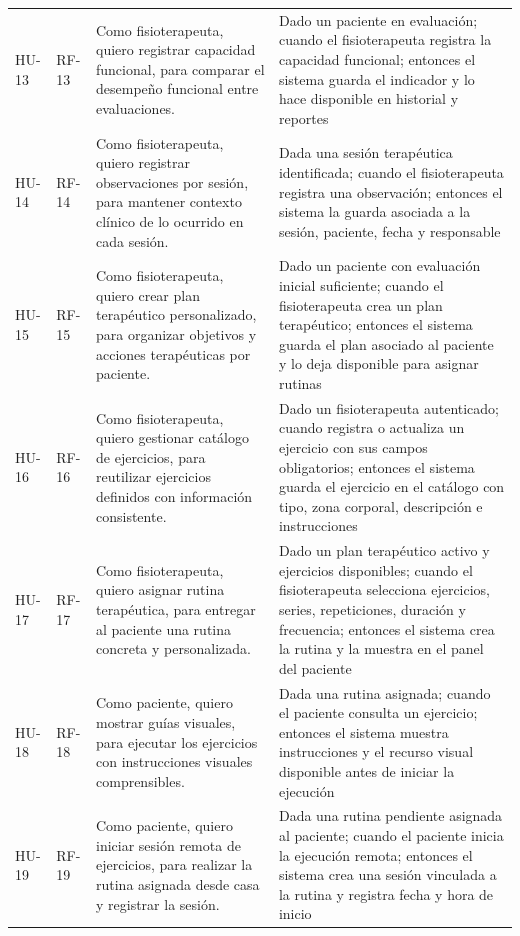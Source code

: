 \documentclass[12pt,a4paper]{article}
\begin{document}
\begin{longtable}{p{}p{}p{}p{}}
HU-13 & RF-13 & Como fisioterapeuta, quiero registrar capacidad funcional, para comparar el desempeño funcional entre evaluaciones. & Dado un paciente en evaluación; cuando el fisioterapeuta registra la capacidad funcional; entonces el sistema guarda el indicador y lo hace disponible en historial y reportes \\
HU-14 & RF-14 & Como fisioterapeuta, quiero registrar observaciones por sesión, para mantener contexto clínico de lo ocurrido en cada sesión. & Dada una sesión terapéutica identificada; cuando el fisioterapeuta registra una observación; entonces el sistema la guarda asociada a la sesión, paciente, fecha y responsable \\
HU-15 & RF-15 & Como fisioterapeuta, quiero crear plan terapéutico personalizado, para organizar objetivos y acciones terapéuticas por paciente. & Dado un paciente con evaluación inicial suficiente; cuando el fisioterapeuta crea un plan terapéutico; entonces el sistema guarda el plan asociado al paciente y lo deja disponible para asignar rutinas \\
HU-16 & RF-16 & Como fisioterapeuta, quiero gestionar catálogo de ejercicios, para reutilizar ejercicios definidos con información consistente. & Dado un fisioterapeuta autenticado; cuando registra o actualiza un ejercicio con sus campos obligatorios; entonces el sistema guarda el ejercicio en el catálogo con tipo, zona corporal, descripción e instrucciones \\
HU-17 & RF-17 & Como fisioterapeuta, quiero asignar rutina terapéutica, para entregar al paciente una rutina concreta y personalizada. & Dado un plan terapéutico activo y ejercicios disponibles; cuando el fisioterapeuta selecciona ejercicios, series, repeticiones, duración y frecuencia; entonces el sistema crea la rutina y la muestra en el panel del paciente \\
HU-18 & RF-18 & Como paciente, quiero mostrar guías visuales, para ejecutar los ejercicios con instrucciones visuales comprensibles. & Dada una rutina asignada; cuando el paciente consulta un ejercicio; entonces el sistema muestra instrucciones y el recurso visual disponible antes de iniciar la ejecución \\
HU-19 & RF-19 & Como paciente, quiero iniciar sesión remota de ejercicios, para realizar la rutina asignada desde casa y registrar la sesión. & Dada una rutina pendiente asignada al paciente; cuando el paciente inicia la ejecución remota; entonces el sistema crea una sesión vinculada a la rutina y registra fecha y hora de inicio \\

\end{longtable}
\end{document}
